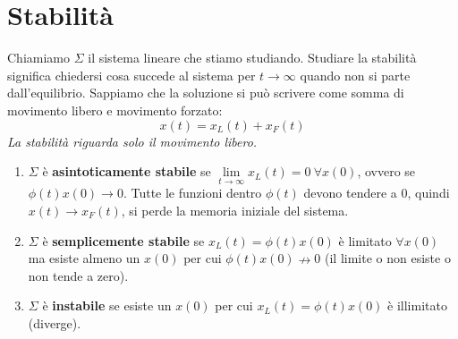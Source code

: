\documentclass[10pt,a4paper]{book}
\begin{document}
\chapter{Stabilità}

Chiamiamo $\Sigma $ il sistema lineare che stiamo studiando. Studiare la stabilità significa chiedersi cosa succede al sistema per $t\rightarrow \infty $ quando non si parte dall'equilibrio. Sappiamo che la soluzione si può scrivere come somma di movimento libero e movimento forzato:
\begin{equation*}
x\left( t\right) =x_{L}\left( t\right) +x_{F}\left( t\right)
\end{equation*}
\textit{La stabilità riguarda solo il movimento libero.}
\begin{enumerate}
\item $\Sigma $ è \textbf{asintoticamente stabile} se $\lim\limits _{t\rightarrow \infty } x_{L}\left( t\right) =0\ \forall x\left( 0\right)$, ovvero se $\phi \left( t\right) x\left( 0\right)\rightarrow 0$. Tutte le funzioni dentro $\phi \left( t\right)$ devono tendere a $0$, quindi $x\left( t\right)\rightarrow x_{F}\left( t\right)$, si perde la memoria iniziale del sistema.
\item $\Sigma $ è \textbf{semplicemente stabile} se $x_{L}\left( t\right) =\phi \left( t\right) x\left( 0\right)$ è limitato $\forall x\left( 0\right)$ ma esiste almeno un $x\left( 0\right)$ per cui $\phi \left( t\right) x\left( 0\right) \nrightarrow 0$ (il limite o non esiste o non tende a zero).
\item $\Sigma $ è \textbf{instabile} se esiste un $x\left( 0\right)$ per cui $x_{L}\left( t\right) =\phi \left( t\right) x\left( 0\right)$ è illimitato (diverge).
\end{enumerate}
\end{document}
